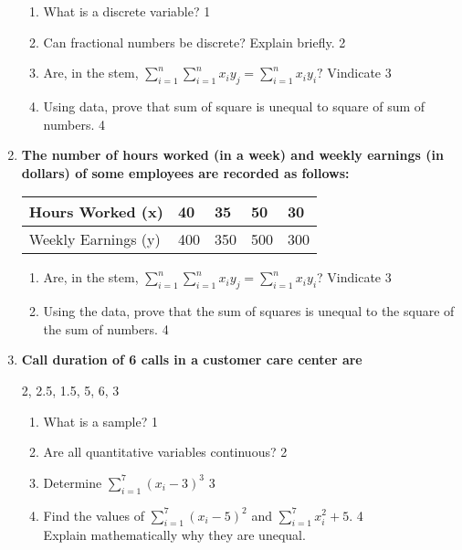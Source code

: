 \documentclass[a4paper,oneside]{book}
\begin{document}
\begin{enumerate}
  \begin{enumerate}
    \item
	What is a discrete variable? \hfill 1
    \item
    	Can fractional numbers be discrete? Explain briefly.  \hfill 2
    \item
    	Are, in the stem, $\displaystyle \sum_{i=1}^{n} 
    	\sum_{i=1}^{n} x_iy_j = \sum_{i=1}^{n} x_iy_i?$ Vindicate \hfill 3
     \item
     	Using data, prove  that sum of square is unequal 
     	to square of sum of numbers. \hfill 4
  \end{enumerate}
  
  \item
\textbf{The number of hours worked (in a week) and weekly earnings (in dollars) of some employees are recorded as follows:}

\begin{table}[h]
\begin{center}
\begin{tabular}{l|l|l|l|l}
Hours Worked (x)  & 40 & 35 & 50 & 30 \\ \hline
Weekly Earnings (y) & 400  & 350  & 500 & 300 \\ 
\end{tabular}
\end{center}
\end{table}

\begin{enumerate}
    \item
    Are, in the stem, $\displaystyle \sum_{i=1}^{n} \sum_{i=1}^{n} x_iy_j = \sum_{i=1}^{n} x_iy_i$? Vindicate \hfill 3
    \item
    Using the data, prove that the sum of squares is unequal to the square of the sum of numbers. \hfill 4
\end{enumerate}

  
   \item
  \textbf{Call duration of 6 calls in a customer care center are}
  
  \begin{center}
  2, 2.5, 1.5, 5, 6, 3
  \end{center}
 
  \begin{enumerate}
    \item
	What is a sample? \hfill 1
    \item
    	Are all quantitative variables continuous?  \hfill 2
    \item
    	Determine $\displaystyle \sum_{i=1}^7 (x_i-3)^3$ \hfill 3
     \item
     	Find the values of  $\displaystyle \sum_{i=1}^7 (x_i-5)^2$ and $\displaystyle \sum_{i=1}^7 x_i^2+5.$  \hfill 4 \\
     	Explain mathematically why they are unequal.
  \end{enumerate}
  

\end{enumerate}
\end{document}
